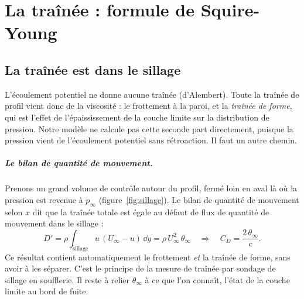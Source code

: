 \chapter{La traînée : formule de Squire-Young}\label{ch:trainee}

\section{La traînée est dans le sillage}
L'écoulement potentiel ne donne aucune traînée (d'Alembert). Toute la traînée de profil vient donc de la viscosité : le frottement à la paroi, et la \emph{traînée de forme}, qui est l'effet de l'épaississement de la couche limite sur la distribution de pression. Notre modèle ne calcule pas cette seconde part directement, puisque la pression vient de l'écoulement potentiel sans rétroaction. Il faut un autre chemin.

\paragraph{Le bilan de quantité de mouvement.} Prenons un grand volume de contrôle autour du profil, fermé loin en aval là où la pression est revenue à $p_\infty$ (figure~\ref{fig:sillage}). Le bilan de quantité de mouvement selon $x$ dit que la traînée totale est égale au défaut de flux de quantité de mouvement dans le sillage :
\[
D'=\rho\int_{\text{sillage}}u\,(U_\infty-u)\,\dd y=\rho\,U_\infty^2\,\theta_\infty
\quad\Longrightarrow\quad
C_D=\frac{2\,\theta_\infty}{c}.
\]
Ce résultat contient automatiquement le frottement \emph{et} la traînée de forme, sans avoir à les séparer. C'est le principe de la mesure de traînée par sondage de sillage en soufflerie. Il reste à relier $\theta_\infty$ à ce que l'on connaît, l'état de la couche limite au bord de fuite.

